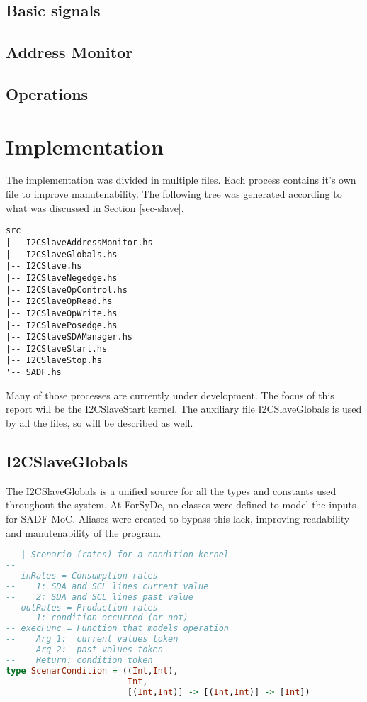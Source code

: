 \documentclass{article}
\begin{document}
\subsection{Basic signals}
\subsection{Address Monitor}
\subsection{Operations}


\section{Implementation} \label{sec-imple}
The implementation was divided in multiple files. Each process contains it's own file to improve manutenability. The following tree was generated according to what was discussed in Section \ref{sec-slave}.
\begin{lstlisting}[frame=single, basicstyle=\small, caption={Files of implementation}, captionpos=b]
src
|-- I2CSlaveAddressMonitor.hs
|-- I2CSlaveGlobals.hs
|-- I2CSlave.hs
|-- I2CSlaveNegedge.hs
|-- I2CSlaveOpControl.hs
|-- I2CSlaveOpRead.hs
|-- I2CSlaveOpWrite.hs
|-- I2CSlavePosedge.hs
|-- I2CSlaveSDAManager.hs
|-- I2CSlaveStart.hs
|-- I2CSlaveStop.hs
'-- SADF.hs
\end{lstlisting}
Many of those processes are currently under development. The focus of this report will be the I2CSlaveStart kernel. The auxiliary file I2CSlaveGlobals is used by all the files, so will be described as well.

\subsection{I2CSlaveGlobals}

The I2CSlaveGlobals is a unified source for all the types and constants used throughout the system. At ForSyDe, no classes were defined to model the inputs for SADF MoC. Aliases were created to bypass this lack, improving readability and manutenability of the program.
\begin{lstlisting}[frame=single, basicstyle=\small, language={Haskell}, caption={Alias for the Condition's scenario type}, captionpos=b]
-- | Scenario (rates) for a condition kernel
--
-- inRates = Consumption rates
--    1: SDA and SCL lines current value
--    2: SDA and SCL lines past value
-- outRates = Production rates
--    1: condition occurred (or not)
-- execFunc = Function that models operation
--    Arg 1:  current values token
--    Arg 2:  past values token
--    Return: condition token
type ScenarCondition = ((Int,Int),
                        Int,
                        [(Int,Int)] -> [(Int,Int)] -> [Int])
\end{lstlisting}
\end{document}
